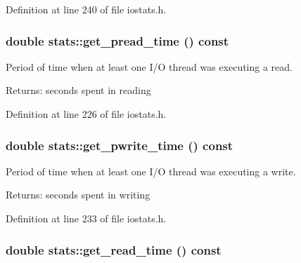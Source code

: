 Definition at line 240 of file iostats.h.\hypertarget{group__iolayer_g8dce58f17e3ef7d8465b097a72f0a781}{
\subsubsection[{get\_\-pread\_\-time}]{\setlength{\rightskip}{0pt plus 5cm}double stats::get\_\-pread\_\-time () const}}
\label{group__iolayer_g8dce58f17e3ef7d8465b097a72f0a781}


Period of time when at least one I/O thread was executing a read. 

\begin{Desc}
\item[Returns:]seconds spent in reading \end{Desc}


Definition at line 226 of file iostats.h.\hypertarget{group__iolayer_gd9f7e56d99697abdca76f1ef1ea1ff00}{
\subsubsection[{get\_\-pwrite\_\-time}]{\setlength{\rightskip}{0pt plus 5cm}double stats::get\_\-pwrite\_\-time () const}}
\label{group__iolayer_gd9f7e56d99697abdca76f1ef1ea1ff00}


Period of time when at least one I/O thread was executing a write. 

\begin{Desc}
\item[Returns:]seconds spent in writing \end{Desc}


Definition at line 233 of file iostats.h.\hypertarget{group__iolayer_g5425890c2062eb9bed6a73343b8ffb25}{
\subsubsection[{get\_\-read\_\-time}]{\setlength{\rightskip}{0pt plus 5cm}double stats::get\_\-read\_\-time () const}}
\label{group__iolayer_g5425890c2062eb9bed6a73343b8ffb25}


